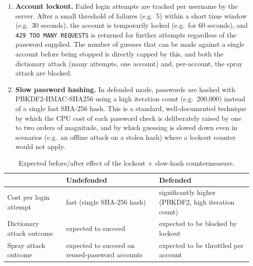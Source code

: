 \documentclass[11pt]{article}
\begin{document}
\begin{enumerate}[leftmargin=*]
  \item \textbf{Account lockout.} Failed login attempts are tracked per username by
    the server. After a small threshold of failures (e.g.\ 5) within a short time
    window (e.g.\ 30 seconds), the account is temporarily locked (e.g.\ for 60
    seconds), and \texttt{429 TOO MANY REQUESTS} is returned for further attempts
    regardless of the password supplied. The number of guesses that can be made
    against a single account before being stopped is directly capped by this, and
    both the dictionary attack (many attempts, one account) and, per-account, the
    spray attack are blocked.
  \item \textbf{Slow password hashing.} In defended mode, passwords are hashed with
    PBKDF2-HMAC-SHA256 using a high iteration count (e.g.\ 200{,}000) instead of a
    single fast SHA-256 hash. This is a standard, well-documented technique by which
    the CPU cost of each password check is deliberately raised by one to two orders
    of magnitude, and by which guessing is slowed down even in scenarios (e.g.\ an
    offline attack on a stolen hash) where a lockout counter would not apply.
\end{enumerate}

\begin{table}[H]
\centering
\begin{tabularx}{\textwidth}{@{} l X X @{}}
\toprule
\rowcolor{navy!12}
& \textbf{Undefended} & \textbf{Defended} \\
\midrule
Cost per login attempt & fast (single SHA-256 hash) & significantly higher (PBKDF2, high iteration count) \\
Dictionary attack outcome & \textcolor{oklive}{expected to succeed} & \textcolor{lockred}{expected to be blocked by lockout} \\
Spray attack outcome & \textcolor{oklive}{expected to succeed on reused-password accounts} & \textcolor{warnamber!90!black}{expected to be throttled per account} \\
\bottomrule
\end{tabularx}
\caption{Expected before/after effect of the lockout + slow-hash countermeasure.}
\end{table}
\end{document}
